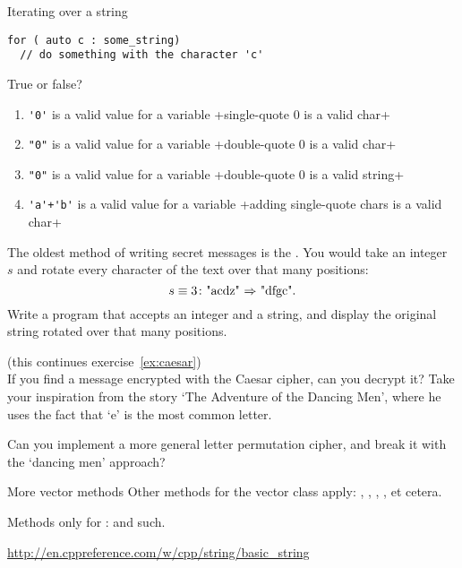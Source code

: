 \begin{block}{Iterating over a string}
\begin{lstlisting}
for ( auto c : some_string)
  // do something with the character 'c'
\end{lstlisting}
\end{block}

\begin{review}
  \label{q:string}
  True or false?
  \begin{enumerate}
  \item \verb+'0'+ is a valid value for a  variable
    \slackpollTF+single-quote 0 is a valid char+
  \item \verb+"0"+ is a valid value for a  variable
    \slackpollTF+double-quote 0 is a valid char+
  \item \verb+"0"+ is a valid value for a  variable
    \slackpollTF+double-quote 0 is a valid string+
  \item \verb/'a'+'b'/ is a valid value for a  variable
    \slackpollTF+adding single-quote chars is a valid char+
  \end{enumerate}
\end{review}

\begin{exercise}
  \label{ex:caesar}
  The oldest method of writing secret messages is the
  . You would take an integer~$s$ and rotate every character 
  of the text over that many positions:
  \[ s\equiv3\colon \hbox{"acdz" $\Rightarrow$ "dfgc"}. \]
  Write a program that accepts an integer and a string, and display
  the original string rotated over that many positions.
\end{exercise}
\begin{exercise}
  \label{ex:caesar-decrypt}
  (this continues exercise~\ref{ex:caesar})\\
  If you find a message encrypted with the Caesar cipher, can you
  decrypt it? Take your inspiration from the
   story `The Adventure of the Dancing
  Men', where he uses the fact that `e' is the most common letter.

  Can you implement a more general letter permutation cipher, and
  break it with the `dancing men' approach?
\end{exercise}

\begin{block}{More vector methods}
  \label{sl:string-vector-methods}
  Other methods for the vector class apply: , ,
  , , et cetera.


  Methods only for :  and such.

  \url{http://en.cppreference.com/w/cpp/string/basic_string}
\end{block}

